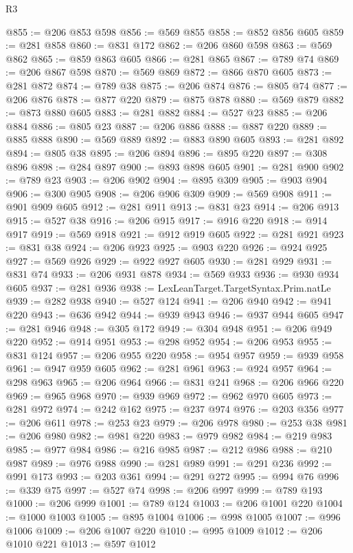 \begin{lexlean}{R3}
\begin{coremodule}
@855 := @206 @853 @598
@856 := @569 @855
@858 := @852 @856 @605
@859 := @281 @858
@860 := @831 @172
@862 := @206 @860 @598
@863 := @569 @862
@865 := @859 @863 @605
@866 := @281 @865
@867 := @789 @74
@869 := @206 @867 @598
@870 := @569 @869
@872 := @866 @870 @605
@873 := @281 @872
@874 := @789 @38
@875 := @206 @874
@876 := @805 @74
@877 := @206 @876
@878 := @877 @220
@879 := @875 @878
@880 := @569 @879
@882 := @873 @880 @605
@883 := @281 @882
@884 := @527 @23
@885 := @206 @884
@886 := @805 @23
@887 := @206 @886
@888 := @887 @220
@889 := @885 @888
@890 := @569 @889
@892 := @883 @890 @605
@893 := @281 @892
@894 := @805 @38
@895 := @206 @894
@896 := @895 @220
@897 := @308 @896
@898 := @284 @897
@900 := @893 @898 @605
@901 := @281 @900
@902 := @789 @23
@903 := @206 @902
@904 := @895 @309
@905 := @903 @904
@906 := @300 @905
@908 := @206 @906 @309
@909 := @569 @908
@911 := @901 @909 @605
@912 := @281 @911
@913 := @831 @23
@914 := @206 @913
@915 := @527 @38
@916 := @206 @915
@917 := @916 @220
@918 := @914 @917
@919 := @569 @918
@921 := @912 @919 @605
@922 := @281 @921
@923 := @831 @38
@924 := @206 @923
@925 := @903 @220
@926 := @924 @925
@927 := @569 @926
@929 := @922 @927 @605
@930 := @281 @929
@931 := @831 @74
@933 := @206 @931 @878
@934 := @569 @933
@936 := @930 @934 @605
@937 := @281 @936
@938 := LexLeanTarget.TargetSyntax.Prim.natLe
@939 := @282 @938
@940 := @527 @124
@941 := @206 @940
@942 := @941 @220
@943 := @636 @942
@944 := @939 @943
@946 := @937 @944 @605
@947 := @281 @946
@948 := @305 @172
@949 := @304 @948
@951 := @206 @949 @220
@952 := @914 @951
@953 := @298 @952
@954 := @206 @953
@955 := @831 @124
@957 := @206 @955 @220
@958 := @954 @957
@959 := @939 @958
@961 := @947 @959 @605
@962 := @281 @961
@963 := @924 @957
@964 := @298 @963
@965 := @206 @964
@966 := @831 @241
@968 := @206 @966 @220
@969 := @965 @968
@970 := @939 @969
@972 := @962 @970 @605
@973 := @281 @972
@974 := @242 @162
@975 := @237 @974
@976 := @203 @356
@977 := @206 @611
@978 := @253 @23
@979 := @206 @978
@980 := @253 @38
@981 := @206 @980
@982 := @981 @220
@983 := @979 @982
@984 := @219 @983
@985 := @977 @984
@986 := @216 @985
@987 := @212 @986
@988 := @210 @987
@989 := @976 @988
@990 := @281 @989
@991 := @291 @236
@992 := @991 @173
@993 := @203 @361
@994 := @291 @272
@995 := @994 @76
@996 := @339 @75
@997 := @527 @74
@998 := @206 @997
@999 := @789 @193
@1000 := @206 @999
@1001 := @789 @124
@1003 := @206 @1001 @220
@1004 := @1000 @1003
@1005 := @895 @1004
@1006 := @998 @1005
@1007 := @996 @1006
@1009 := @206 @1007 @220
@1010 := @995 @1009
@1012 := @206 @1010 @221
@1013 := @597 @1012

\end{coremodule}
\end{lexlean}
